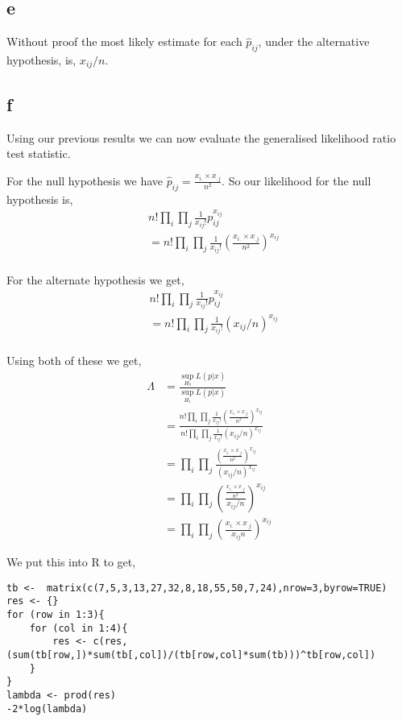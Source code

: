 \documentclass{article}
\begin{document}
\subsection{e}
Without proof the most likely estimate for each $\hat{p}_{ij}$, under the
alternative hypothesis, is, $x_{ij}/n$.

\subsection{f}
Using our previous results we can now evaluate the generalised likelihood ratio
test statistic.

For the null hypothesis we have
$\hat{p}_{ij} = \frac{x_{i.}\times x_{.j}}{n^2}$.
So our likelihood for the null hypothesis is,
\begin{align*}
    &n! \prod_{i} \prod_{j} \frac{1}{x_{ij}!} p_{ij}^{x_{ij}} \\
    &= n! \prod_{i} \prod_{j}
    \frac{1}{x_{ij}!}
    \left(\frac{x_{i.}\times x_{.j}}{n^2}\right)^{x_{ij}} \\
\end{align*}

For the alternate hypothesis we get,
\begin{align*}
    &n! \prod_{i} \prod_{j} \frac{1}{x_{ij}!} p_{ij}^{x_{ij}} \\
    &= n! \prod_{i} \prod_{j}
    \frac{1}{x_{ij}!}
    \left(x_{ij}/n\right)^{x_{ij}} \\
\end{align*}

Using both of these we get,
\begin{align*}
    \Lambda &= \frac{\sup_{H_0} L(p|x)}{\sup_{H_1} L(p|x)} \\
    &= \frac{n! \prod_{i} \prod_{j}
    \frac{1}{x_{ij}!}
    \left(\frac{x_{i.}\times x_{.j}}{n^2}\right)^{x_{ij}}}
    {n! \prod_{i} \prod_{j}
    \frac{1}{x_{ij}!}
    \left(x_{ij}/n\right)^{x_{ij}}} \\
    &= \prod_{i} \prod_{j}
    \frac{\left(\frac{x_{i.}\times x_{.j}}{n^2}\right)^{x_{ij}}}
    {\left(x_{ij}/n\right)^{x_{ij}}} \\
    &= \prod_{i} \prod_{j}
    \left(\frac{\frac{x_{i.}\times x_{.j}}{n^2}}
    {x_{ij}/n}\right)^{x_{ij}} \\
    &= \prod_{i} \prod_{j}
    \left(\frac{x_{i.}\times x_{.j}}
    {x_{ij}n}\right)^{x_{ij}}
\end{align*}

We put this into R to get,
\begin{verbatim}
tb <-  matrix(c(7,5,3,13,27,32,8,18,55,50,7,24),nrow=3,byrow=TRUE)
res <- {}
for (row in 1:3){
    for (col in 1:4){
        res <- c(res, (sum(tb[row,])*sum(tb[,col])/(tb[row,col]*sum(tb)))^tb[row,col])
    }
}
lambda <- prod(res)
-2*log(lambda)
\end{verbatim}
\end{document}
